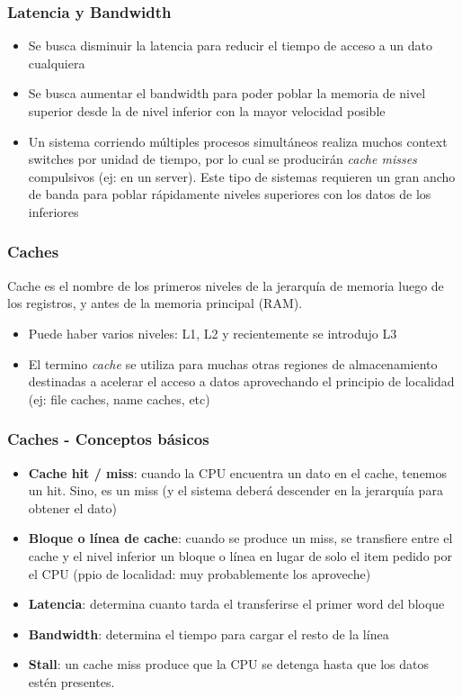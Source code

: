 \documentclass{beamer}
\begin{document}
  \begin{frame}
  \frametitle{Latencia y Bandwidth}
    \begin{itemize}
      \item Se busca disminuir la latencia para reducir el tiempo de acceso a
      un dato cualquiera
      \item Se busca aumentar el bandwidth para poder poblar la memoria de nivel
      superior desde la de nivel inferior con la mayor velocidad posible
      \item Un sistema corriendo múltiples procesos simultáneos realiza muchos
      context switches por unidad de tiempo, por lo cual se producirán
      \emph{cache misses} compulsivos (ej: en un server). Este tipo de sistemas
      requieren un gran ancho de banda para poblar rápidamente niveles
      superiores con los datos de los inferiores
    \end{itemize}
  \end{frame}
    
  \begin{frame}
  \frametitle{Caches}
    Cache es el nombre de los primeros niveles de la jerarquía de memoria luego
    de los registros, y antes de la memoria principal (RAM).
    \begin{itemize}
      \item Puede haber varios niveles: L1, L2 y recientemente se introdujo L3
      \item El termino \emph{cache} se utiliza para muchas otras regiones de
      almacenamiento destinadas a acelerar el acceso a datos aprovechando el
      principio de localidad (ej: file caches, name caches, etc)
    \end{itemize}
  \end{frame}

  \begin{frame}
  \frametitle{Caches - Conceptos básicos}
    \begin{itemize}
      \item \textbf{Cache hit / miss}: cuando la CPU encuentra un dato en
      el cache, tenemos un hit. Sino, es un miss (y el sistema deberá
      descender en la jerarquía para obtener el dato)
      \item \textbf{Bloque o línea de cache}: cuando se produce un miss,
      se transfiere entre el cache y el nivel inferior un bloque o línea en
      lugar de solo el item pedido por el CPU (ppio de localidad: muy
      probablemente los aproveche)
      \item \textbf{Latencia}: determina cuanto tarda el transferirse el
      primer word del bloque
      \item \textbf{Bandwidth}: determina el tiempo para cargar el resto de
      la línea
      \item \textbf{Stall}: un cache miss produce que la CPU se detenga hasta que los datos estén presentes.
    \end{itemize}
  \end{frame}
 
\end{document}
